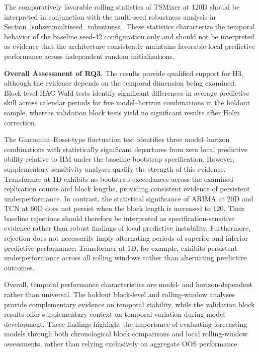 \documentclass[runningheads,orivec]{llncs}
\begin{document}
The comparatively favorable rolling statistics of TSMixer at 120D should be interpreted in conjunction with the multi-seed robustness analysis in \hyperref[subsec:multiseed_robustness]{Section~\ref*{subsec:multiseed_robustness}}. These statistics characterize the temporal behavior of the baseline seed-42 configuration only and should not be interpreted as evidence that the architecture consistently maintains favorable local predictive performance across independent random initializations.

\medskip
\noindent\textbf{Overall Assessment of RQ3.}
The results provide qualified support for H3, although the evidence depends on the temporal dimension being examined. Block-level HAC Wald tests identify significant differences in average predictive skill across calendar periods for five model--horizon combinations in the holdout sample, whereas validation block tests yield no significant results after Holm correction.

The Giacomini--Rossi-type fluctuation test identifies three model--horizon combinations with statistically significant departures from zero local predictive ability relative to HM under the baseline bootstrap specification. However, supplementary sensitivity analyses qualify the strength of this evidence. Transformer at 1D exhibits no bootstrap exceedances across the examined replication counts and block lengths, providing consistent evidence of persistent underperformance. In contrast, the statistical significance of ARIMA at 20D and TCN at 60D does not persist when the block length is increased to 120. Their baseline rejections should therefore be interpreted as specification-sensitive evidence rather than robust findings of local predictive instability. Furthermore, rejection does not necessarily imply alternating periods of superior and inferior predictive performance; Transformer at 1D, for example, exhibits persistent underperformance across all rolling windows rather than alternating predictive outcomes.

Overall, temporal performance characteristics are model- and horizon-dependent rather than universal. The holdout block-level and rolling-window analyses provide complementary evidence on temporal stability, while the validation block results offer supplementary context on temporal variation during model development. These findings highlight the importance of evaluating forecasting models through both chronological block comparisons and local rolling-window assessments, rather than relying exclusively on aggregate OOS performance.
\end{document}
